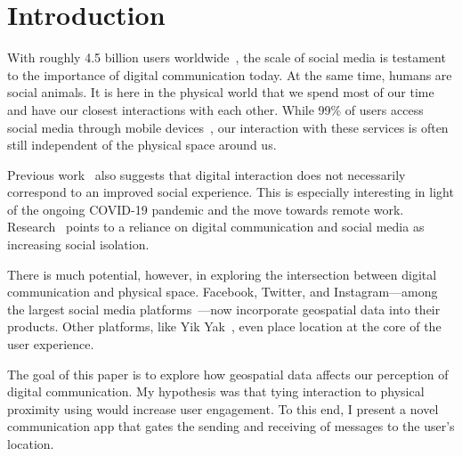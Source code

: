\section{Introduction}

With roughly 4.5 billion users worldwide~\cite{umaine_2021}, the scale of social media is testament to the importance of digital communication today. At the same time, humans are social animals. It is here in the physical world that we spend most of our time and have our closest interactions with each other. While 99\% of users access social media through mobile devices~\cite{umaine_2021}, our interaction with these services is often still independent of the physical space around us.

Previous work~\cite{ducheneaut_2006} also suggests that digital interaction does not necessarily correspond to an improved social experience. This is especially interesting in light of the ongoing \textsc{COVID-19} pandemic and the move towards remote work. Research~\cite{bonsaksen_2021,mann_2003} points to a reliance on digital communication and social media as increasing social isolation.

There is much potential, however, in exploring the intersection between digital communication and physical space. Facebook, Twitter, and Instagram—among the largest social media platforms~\cite{umaine_2021}—now incorporate geospatial data into their products. Other platforms, like Yik Yak~\cite{yikyak_2015}, even place location at the core of the user experience.

The goal of this paper is to explore how geospatial data affects our perception of digital communication. My hypothesis was that tying interaction to physical proximity using would increase user engagement. To this end, I present a novel communication app that gates the sending and receiving of messages to the user's location.
